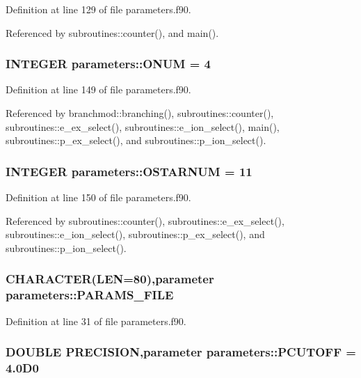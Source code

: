 Definition at line 129 of file parameters.f90.

Referenced by subroutines::counter(), and main().\hypertarget{namespaceparameters_a726526c727d771bb10d9af8e2d3240f5}{
\subsubsection[{ONUM}]{\setlength{\rightskip}{0pt plus 5cm}INTEGER {\bf parameters::ONUM} = 4}}
\label{namespaceparameters_a726526c727d771bb10d9af8e2d3240f5}


Definition at line 149 of file parameters.f90.

Referenced by branchmod::branching(), subroutines::counter(), subroutines::e\_\-ex\_\-select(), subroutines::e\_\-ion\_\-select(), main(), subroutines::p\_\-ex\_\-select(), and subroutines::p\_\-ion\_\-select().\hypertarget{namespaceparameters_a7f259c2e69027b208f7e09e6d672574d}{
\subsubsection[{OSTARNUM}]{\setlength{\rightskip}{0pt plus 5cm}INTEGER {\bf parameters::OSTARNUM} = 11}}
\label{namespaceparameters_a7f259c2e69027b208f7e09e6d672574d}


Definition at line 150 of file parameters.f90.

Referenced by subroutines::counter(), subroutines::e\_\-ex\_\-select(), subroutines::e\_\-ion\_\-select(), subroutines::p\_\-ex\_\-select(), and subroutines::p\_\-ion\_\-select().\hypertarget{namespaceparameters_adf79c33c6ebf2e4f00fa0fdaf34d1ba1}{
\subsubsection[{PARAMS\_\-FILE}]{\setlength{\rightskip}{0pt plus 5cm}CHARACTER(LEN=80),parameter {\bf parameters::PARAMS\_\-FILE}}}
\label{namespaceparameters_adf79c33c6ebf2e4f00fa0fdaf34d1ba1}


Definition at line 31 of file parameters.f90.\hypertarget{namespaceparameters_abb73420de652567f8698014e0df31f53}{
\subsubsection[{PCUTOFF}]{\setlength{\rightskip}{0pt plus 5cm}DOUBLE PRECISION,parameter {\bf parameters::PCUTOFF} = 4.0D0}}
\label{namespaceparameters_abb73420de652567f8698014e0df31f53}


